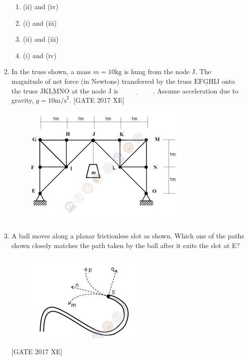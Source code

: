 \documentclass[journal,12pt,onecolumn]{IEEEtran}
\theoremstyle{remark}
\begin{document}
\begin{enumerate}
\begin{multicols}{2}
\begin{enumerate}
    \item (ii) and (iv)
    \item (i) and (iii)
    \item (ii) and (iii)
    \item (i) and (iv)
\end{enumerate}
\end{multicols}
\item In the truss shown, a mass $m=10\text{kg}$ is hung from the node J. The magnitude of net force (in Newtons) transferred by the truss $\underline{\text{EFGHIJ}}$ onto the truss $\underline{\text{JKLMNO}}$ at the node J is $\underline{\hspace{2cm}}$.
Assume acceleration due to gravity, $g=10\text{m/s}^2$.
\hfill [GATE 2017 XE]
\begin{figure}[H]
    \centering
    \includegraphics[width=0.5\linewidth]{figs/fig10.png}
    \caption{}
    \label{fig:fig10}
\end{figure}
\item A ball moves along a planar frictionless slot as shown. Which one of the paths shown closely matches the path taken by the ball after it exits the slot at E?
\begin{figure}[H]
    \centering
    \includegraphics[width=0.5\linewidth]{figs/fig11.png}
    \caption{}
    \label{fig:fig11}
\end{figure}
\hfill [GATE 2017 XE]


\end{enumerate}
\end{document}
